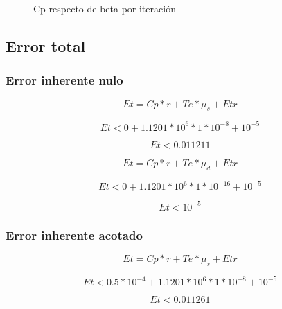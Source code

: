 \documentclass[11pt,a4paper]{article}
\begin{document}
\begin{figure}[H]
	\caption{Cp respecto de beta por iteración}
	\label{fig:cpsb}
\end{figure}

\subsection{Error total}

\subsubsection{Error inherente nulo}

\[ Et = Cp * r + Te * \mu_s + Etr \]

\[ Et < 0 + 1.1201*10^6 * 1*10^{-8} + 10^{-5} \]

\[ Et < 0.011211\]

\[ Et = Cp * r + Te * \mu_d + Etr \]

\[ Et < 0 + 1.1201*10^6 * 1*10^{-16} + 10^{-5} \]

\[ Et < 10^{-5}\]

\subsubsection{Error inherente acotado}

\[ Et = Cp * r + Te * \mu_s + Etr \]

\[ Et < 0.5*10^{-4} + 1.1201*10^6 * 1*10^{-8} + 10^{-5} \]

\[ Et < 0.011261\]
\end{document}
